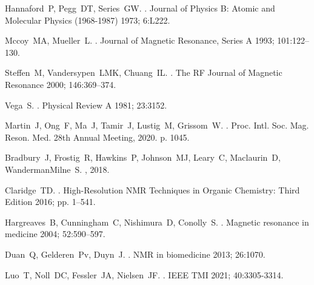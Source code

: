 \documentclass[a4paper,12pt]{article}
\begin{document}
\begin{thebibliography}{10}
Hannaford~P, Pegg~DT, Series~GW.
.
\newblock Journal of Physics B: Atomic and Molecular Physics (1968-1987) 1973;
  6:L222.

Mccoy~MA, Mueller~L.
.
\newblock Journal of Magnetic Resonance, Series A 1993; 101:122--130.

Steffen~M, Vandersypen~LMK, Chuang~IL.
.
\newblock The RF Journal of Magnetic Resonance 2000; 146:369--374.

Vega~S.
.
\newblock Physical Review A 1981; 23:3152.

Martin~J, Ong~F, Ma~J, Tamir~J, Lustig~M, Grissom~W.
.
  Proc. Intl. Soc. Mag. Reson. Med. 28th Annual Meeting, 2020.  p. 1045.

Bradbury~J, Frostig~R, Hawkins~P, Johnson~MJ, Leary~C, Maclaurin~D,
  WandermanMilne~S.
, 2018.

Claridge~TD.
.
\newblock High-Resolution NMR Techniques in Organic Chemistry: Third Edition
  2016; pp. 1--541.

Hargreaves~B, Cunningham~C, Nishimura~D, Conolly~S.
.
\newblock Magnetic resonance in medicine 2004; 52:590--597.

Duan~Q, Gelderen~Pv, Duyn~J.
.
\newblock NMR in biomedicine 2013; 26:1070.

Luo~T, Noll~DC, Fessler~JA, Nielsen~JF.
.
\newblock IEEE TMI 2021; 40:3305-3314.



\end{thebibliography}
\end{document}

